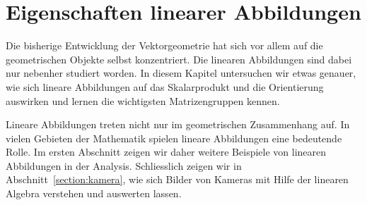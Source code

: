 %
%
%
\chapter{Eigenschaften linearer Abbildungen\label{chapter:eigenschaften}}
\rhead{}
Die bisherige Entwicklung der Vektorgeometrie hat sich vor allem auf
die geometrischen Objekte selbst konzentriert. 
Die linearen Abbildungen sind dabei nur nebenher studiert worden.
In diesem Kapitel untersuchen wir etwas genauer, wie sich lineare Abbildungen
auf das Skalarprodukt und die Orientierung auswirken und lernen die
wichtigsten Matrizengruppen kennen.

Lineare Abbildungen treten nicht nur im geometrischen Zusammenhang auf.
In vielen Gebieten der Mathematik spielen lineare Abbildungen eine
bedeutende Rolle.
Im ersten Abschnitt zeigen wir daher weitere Beispiele von linearen
Abbildungen in der Analysis.
Schliesslich zeigen wir in Abschnitt~\ref{section:kamera}, wie sich
Bilder von Kameras mit Hilfe der linearen Algebra verstehen und auswerten
lassen.





%





